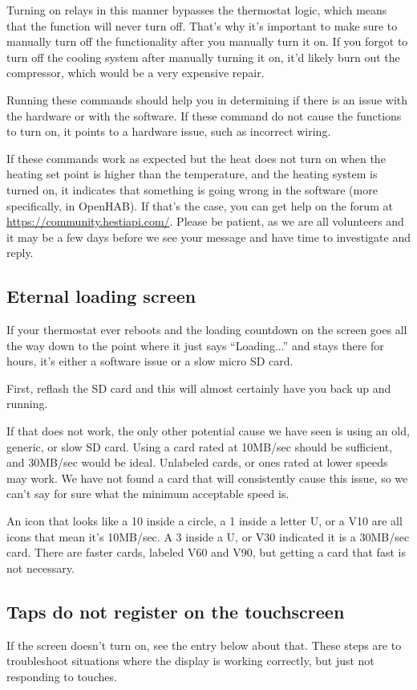 Turning on relays in this manner bypasses the thermostat logic, which means
that the function will never turn off. That's why it's important to make sure
to manually turn off the functionality after you manually turn it on. If you
forgot to turn off the cooling system after manually turning it on, it'd likely
burn out the compressor, which would be a very expensive repair.

Running these commands should help you in determining if there is an issue with
the hardware or with the software. If these command do not cause the functions
to turn on, it points to a hardware issue, such as incorrect wiring.

If these commands work as expected but the heat does not turn on when the
heating set point is higher than the temperature, and the heating system is
turned on, it indicates that something is going wrong in the software (more
specifically, in OpenHAB). If that's the case, you can get help on the forum
at \url{https://community.hestiapi.com/}. Please be patient, as we are all
volunteers and it may be a few days before we see your message and have time to
investigate and reply.

\subsection{Eternal loading screen}
If your thermostat ever reboots and the loading countdown on the screen goes
all the way down to the point where it just says ``Loading...'' and stays there
for hours, it's either a software issue or a slow micro SD card.

First, reflash the SD card and this will almost certainly have you back up and
running.

If that does not work, the only other potential cause we have seen is using an
old, generic, or slow SD card. Using a card rated at 10MB/sec should be
sufficient, and 30MB/sec would be ideal. Unlabeled cards, or ones rated at
lower speeds may work. We have not found a card that will consistently cause
this issue, so we can't say for sure what the minimum acceptable speed is.

An icon that looks like a 10 inside a circle, a 1 inside a letter U, or a V10
are all icons that mean it's 10MB/sec. A 3 inside a U, or V30 indicated it is
a 30MB/sec card. There are faster cards, labeled V60 and V90, but getting a
card that fast is not necessary.

\subsection{Taps do not register on the touchscreen}
If the screen doesn't turn on, see the entry below about that. These steps are
to troubleshoot situations where the display is working correctly, but just not
responding to touches.

